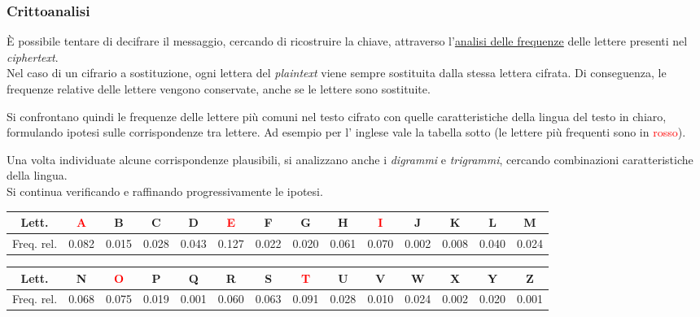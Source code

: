 \subsubsection{Crittoanalisi}

\noindent È possibile tentare di decifrare il messaggio, cercando di ricostruire la chiave, attraverso l'\underline{analisi delle
frequenze} delle lettere presenti nel \textit{ciphertext}. \\ Nel caso di un cifrario a sostituzione, ogni lettera del \textit{plaintext} viene sempre sostituita dalla stessa lettera cifrata. Di conseguenza, le frequenze relative delle lettere vengono conservate, anche se le lettere sono sostituite.

\vspace{1em} \noindent Si confrontano quindi le frequenze delle lettere più comuni nel testo cifrato con quelle caratteristiche della lingua del testo in chiaro, formulando ipotesi sulle corrispondenze tra lettere. Ad esempio per l' inglese vale la tabella sotto (le lettere più frequenti sono in \textcolor{red}{rosso}). 

\vspace{1em} \noindent Una volta individuate alcune corrispondenze plausibili, si analizzano anche i \textit{digrammi} e \textit{trigrammi}, cercando
combinazioni caratteristiche della lingua. \\ Si continua verificando e raffinando progressivamente le ipotesi. 

\begin{center}
\begin{tabular}{c|ccccccccccccc}
Lett. & \textcolor{red}{A} & B & C & D & \textcolor{red}{E} & F & G & H & \textcolor{red}{I} & J & K & L & M\\
\hline
Freq. rel. &
0.082 & 0.015 & 0.028 & 0.043 & 0.127 &
0.022 & 0.020 & 0.061 & 0.070 & 0.002 &
0.008 & 0.040 & 0.024
\end{tabular}
\end{center}

\begin{center}
\begin{tabular}{c|ccccccccccccc}
Lett. & N & \textcolor{red}{O} & P & Q & R & S & \textcolor{red}{T} & U & V & W & X & Y & Z\\
\hline
Freq. rel. &
0.068 & 0.075 & 0.019 & 0.001 & 0.060 &
0.063 & 0.091 & 0.028 & 0.010 & 0.024 &
0.002 & 0.020 & 0.001
\end{tabular}
\end{center}

